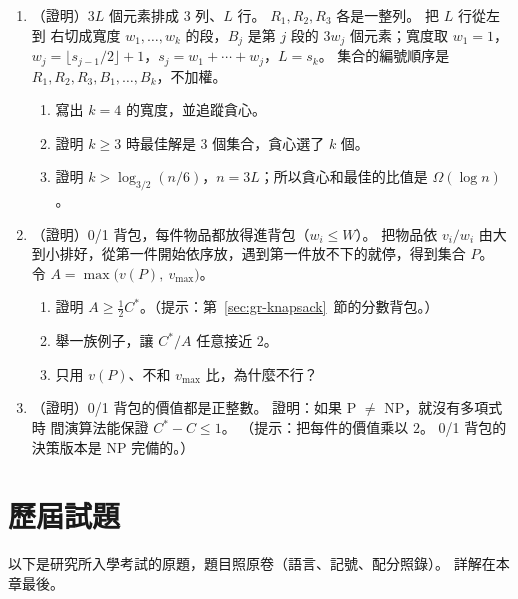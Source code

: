 \begin{enumerate}
\item \label{q:apx-rows}（證明）$3L$ 個元素排成 $3$ 列、$L$ 行。 $R_1, R_2, R_3$ 各是一整列。 把 $L$ 行從左到
右切成寬度 $w_1, \ldots, w_k$ 的段，$B_j$ 是第 $j$ 段的 $3w_j$ 個元素；寬度取 $w_1 = 1$，
$w_j = \lfloor s_{j-1}/2 \rfloor + 1$，$s_j = w_1 + \cdots + w_j$，$L = s_k$。 集合的編號順序是
$R_1, R_2, R_3, B_1, \ldots, B_k$，不加權。
\begin{enumerate}
\item 寫出 $k = 4$ 的寬度，並追蹤貪心。
\item 證明 $k \ge 3$ 時最佳解是 $3$ 個集合，貪心選了 $k$ 個。
\item 證明 $k > \log_{3/2}(n/6)$，$n = 3L$；所以貪心和最佳的比值是 $\Omega(\log n)$。
\end{enumerate}

\item \label{q:apx-knap-half}（證明）0/1 背包，每件物品都放得進背包（$w_i \le W$）。 把物品依
$v_i / w_i$ 由大到小排好，從第一件開始依序放，遇到第一件放不下的就停，得到集合 $P$。 令
$A = \max\bigl(v(P),\ v_{\max}\bigr)$。
\begin{enumerate}
\item 證明 $A \ge \frac12 C^*$。（提示：第~\ref{sec:gr-knapsack}~節的分數背包。）
\item 舉一族例子，讓 $C^* / A$ 任意接近 $2$。
\item 只用 $v(P)$、不和 $v_{\max}$ 比，為什麼不行？
\end{enumerate}

\item \label{q:apx-additive}（證明）0/1 背包的價值都是正整數。 證明：如果 P $\ne$ NP，就沒有多項式時
間演算法能保證 $C^* - C \le 1$。 （提示：把每件的價值乘以 $2$。 0/1 背包的決策版本是 NP 完備的。）

\end{enumerate}

\section{歷屆試題}
\label{sec:apx-pastexam}

以下是研究所入學考試的原題，題目照原卷（語言、記號、配分照錄）。 詳解在本章最後。

